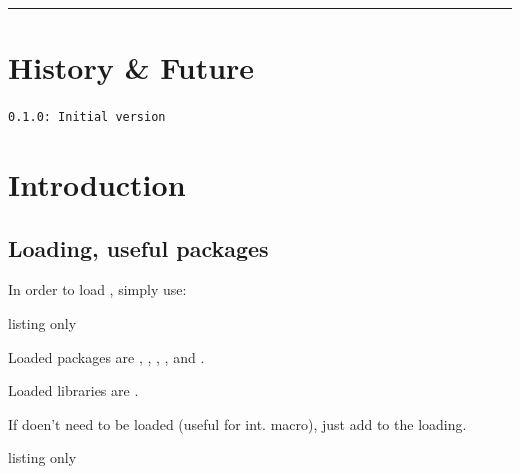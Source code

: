 \documentclass[11pt,a4paper]{ltxdoc}
\begin{document}
%

\hrule

\vspace*{5mm}

\pagebreak


\hypertarget{matoc}{}

\tableofcontents

\vspace*{5mm}

\vfill

\section{History \& Future}

\texttt{0.1.0: Initial version}

\vspace*{5mm}


\pagebreak

\section{Introduction}

\subsection{Loading, useful packages}

In order to load , simply use:

\begin{DemoCode}{listing only}
\usepackage{timeop}
\end{DemoCode}

Loaded packages are , , , ,  and .

Loaded libraries are .

\smallskip

If  doen't need to be loaded (useful for int. macro), just add \ShowCode{[noamssymb]} to the loading.

\begin{DemoCode}{listing only}
\usepackage[noamsmath]{timeop}
\end{DemoCode}
\end{document}
